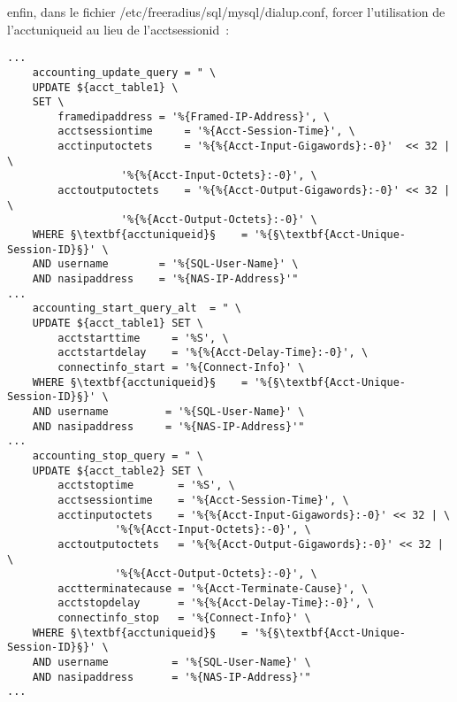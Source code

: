enfin, dans le fichier /etc/freeradius/sql/mysql/dialup.conf, forcer l'utilisation de l'acctuniqueid au lieu de l'acctsessionid~:
\begin{lstlisting}
...
	accounting_update_query = " \
	UPDATE ${acct_table1} \
	SET \
	    framedipaddress = '%{Framed-IP-Address}', \
	    acctsessiontime     = '%{Acct-Session-Time}', \
	    acctinputoctets     = '%{%{Acct-Input-Gigawords}:-0}'  << 32 | \
				  '%{%{Acct-Input-Octets}:-0}', \
	    acctoutputoctets    = '%{%{Acct-Output-Gigawords}:-0}' << 32 | \
				  '%{%{Acct-Output-Octets}:-0}' \
	WHERE §\textbf{acctuniqueid}§    = '%{§\textbf{Acct-Unique-Session-ID}§}' \
	AND username        = '%{SQL-User-Name}' \
	AND nasipaddress    = '%{NAS-IP-Address}'"
...
	accounting_start_query_alt  = " \
	UPDATE ${acct_table1} SET \
	    acctstarttime     = '%S', \
	    acctstartdelay    = '%{%{Acct-Delay-Time}:-0}', \
	    connectinfo_start = '%{Connect-Info}' \
	WHERE §\textbf{acctuniqueid}§    = '%{§\textbf{Acct-Unique-Session-ID}§}' \
	AND username         = '%{SQL-User-Name}' \
	AND nasipaddress     = '%{NAS-IP-Address}'"
...
	accounting_stop_query = " \
	UPDATE ${acct_table2} SET \
	    acctstoptime       = '%S', \
	    acctsessiontime    = '%{Acct-Session-Time}', \
	    acctinputoctets    = '%{%{Acct-Input-Gigawords}:-0}' << 32 | \
				 '%{%{Acct-Input-Octets}:-0}', \
	    acctoutputoctets   = '%{%{Acct-Output-Gigawords}:-0}' << 32 | \
				 '%{%{Acct-Output-Octets}:-0}', \
	    acctterminatecause = '%{Acct-Terminate-Cause}', \
	    acctstopdelay      = '%{%{Acct-Delay-Time}:-0}', \
	    connectinfo_stop   = '%{Connect-Info}' \
	WHERE §\textbf{acctuniqueid}§    = '%{§\textbf{Acct-Unique-Session-ID}§}' \
	AND username          = '%{SQL-User-Name}' \
	AND nasipaddress      = '%{NAS-IP-Address}'"
...
\end{lstlisting}



